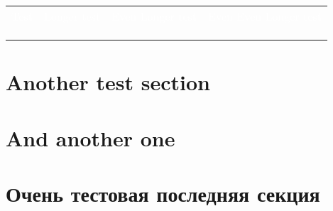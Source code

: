 \documentclass[]{yktsat-datasheet}
\begin{document}
\begin{table}
\centering
\begin{tabular}{|llll|} 
\hline
\rowcolor[rgb]{0.192,0.271,0.314} \textcolor{white}{Test} & \textcolor{white}{Longer test} & \textcolor{white}{Even Longer test} & \textcolor{white}{Even Even Longer test}  \\
                                                          &                                &                                     &                                           \\
\rowcolor[rgb]{0.875,0.922,0.957}                         &                                &                                     &                                           \\
                                                          &                                &                                     &                                           \\
\hline
\end{tabular}
\end{table}
\newpage

\section{Another test section}

\lipsum[1]

\lipsum[5]

\lipsum[5]
\newpage

\section{And another one}

\lipsum[1]

\lipsum[5]

\lipsum[5]

\lipsum[1]
\newpage

\section{Очень тестовая последняя секция}

\lipsum[1]

\lipsum[1]



\end{document}
